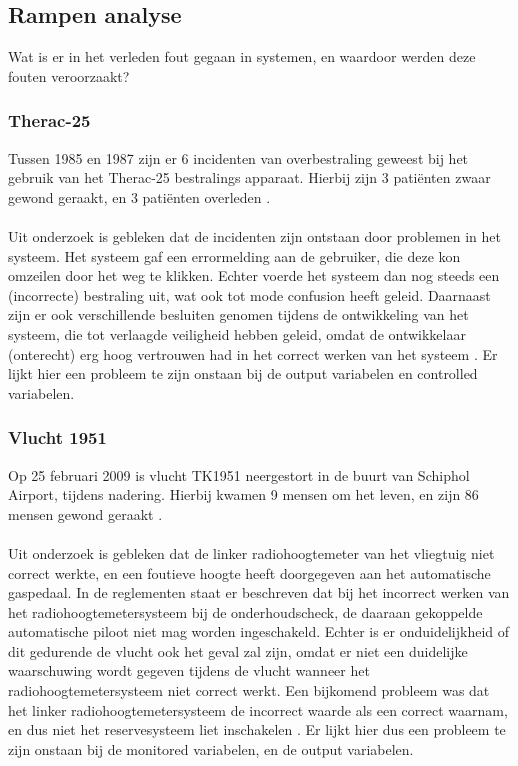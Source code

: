 \documentclass{article}
\begin{document}
  \subsection{Rampen analyse}
    Wat is er in het verleden fout gegaan in systemen, en waardoor werden deze fouten veroorzaakt?

    \subsubsection{Therac-25}
      Tussen 1985 en 1987 zijn er 6 incidenten van overbestraling geweest bij het gebruik van het Therac-25 bestralings apparaat. Hierbij zijn 3 patiënten zwaar gewond geraakt, en 3 patiënten overleden \cite{porrello2012death}. \\\\
      Uit onderzoek is gebleken dat de incidenten zijn ontstaan door problemen in het systeem. Het systeem gaf een errormelding aan de gebruiker, die deze kon omzeilen door het weg te klikken. Echter voerde het systeem dan nog steeds een (incorrecte) bestraling uit, wat ook tot mode confusion heeft geleid. Daarnaast zijn er ook verschillende besluiten genomen tijdens de ontwikkeling van het systeem, die tot verlaagde veiligheid hebben geleid, omdat de ontwikkelaar (onterecht) erg hoog vertrouwen had in het correct werken van het systeem \cite{bozdagtherac}. Er lijkt hier een probleem te zijn onstaan bij de output variabelen en controlled variabelen.

    \subsubsection{Vlucht 1951}
      Op 25 februari 2009 is vlucht TK1951 neergestort in de buurt van Schiphol Airport, tijdens nadering. Hierbij kwamen 9 mensen om het leven, en zijn 86 mensen gewond geraakt \cite{onderzoeksraad2010turkish}. \\\\
      Uit onderzoek is gebleken dat de linker radiohoogtemeter van het vliegtuig niet correct werkte, en een foutieve hoogte heeft doorgegeven aan het automatische gaspedaal. In de reglementen staat er beschreven dat bij het incorrect werken van het radiohoogtemetersysteem bij de onderhoudscheck, de daaraan gekoppelde automatische piloot niet mag worden ingeschakeld. Echter is er onduidelijkheid of dit gedurende de vlucht ook het geval zal zijn, omdat er niet een duidelijke waarschuwing wordt gegeven tijdens de vlucht wanneer het radiohoogtemetersysteem niet correct werkt. Een bijkomend probleem was dat het linker radiohoogtemetersysteem de incorrect waarde als een correct waarnam, en dus niet het reservesysteem liet inschakelen \cite{onderzoeksraad2010turkish}. Er lijkt hier dus een probleem te zijn onstaan bij de monitored variabelen, en de output variabelen.
\end{document}
